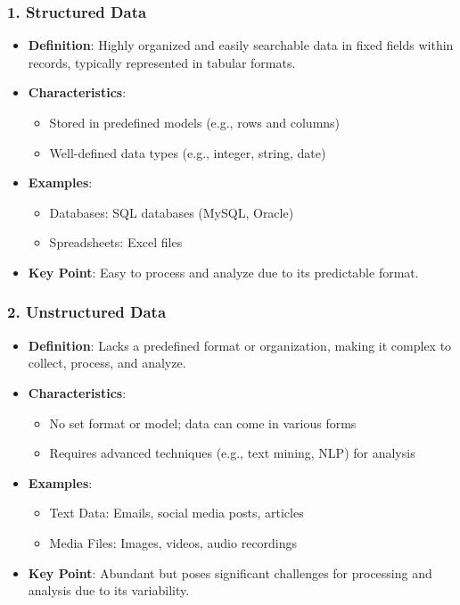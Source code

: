 \documentclass[aspectratio=169]{beamer}
\begin{document}
\begin{frame}[fragile]
    \frametitle{1. Structured Data}
    \begin{itemize}
        \item \textbf{Definition}: Highly organized and easily searchable data in fixed fields within records, typically represented in tabular formats.
        \item \textbf{Characteristics}:
            \begin{itemize}
                \item Stored in predefined models (e.g., rows and columns)
                \item Well-defined data types (e.g., integer, string, date)
            \end{itemize}
        \item \textbf{Examples}:
            \begin{itemize}
                \item Databases: SQL databases (MySQL, Oracle)
                \item Spreadsheets: Excel files
            \end{itemize}
        \item \textbf{Key Point}: Easy to process and analyze due to its predictable format.
    \end{itemize}
\end{frame}

\begin{frame}[fragile]
    \frametitle{2. Unstructured Data}
    \begin{itemize}
        \item \textbf{Definition}: Lacks a predefined format or organization, making it complex to collect, process, and analyze.
        \item \textbf{Characteristics}:
            \begin{itemize}
                \item No set format or model; data can come in various forms
                \item Requires advanced techniques (e.g., text mining, NLP) for analysis
            \end{itemize}
        \item \textbf{Examples}:
            \begin{itemize}
                \item Text Data: Emails, social media posts, articles
                \item Media Files: Images, videos, audio recordings
            \end{itemize}
        \item \textbf{Key Point}: Abundant but poses significant challenges for processing and analysis due to its variability.
    \end{itemize}
\end{frame}
\end{document}
